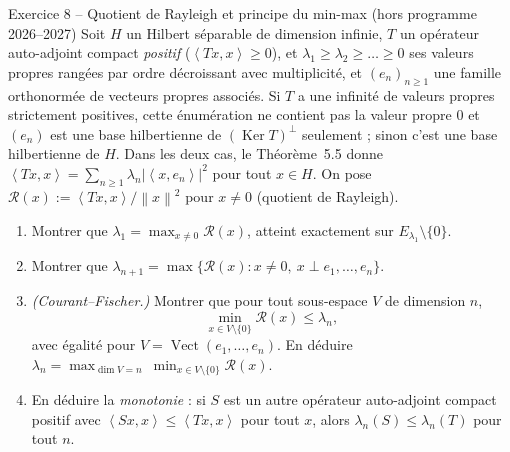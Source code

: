 \documentclass[11pt,a4paper]{article}
\newcommand{\Vect}{\operatorname{Vect}}
\newcommand{\norm}[1]{\left\|#1\right\|}
\newcommand{\ps}[2]{\left\langle #1,#2\right\rangle}
\DeclareMathOperator{\Ker}{Ker}
\theoremstyle{definition}
\begin{document}
\begin{exo}{Exercice 8 -- Quotient de Rayleigh et principe du min-max (hors programme 2026--2027)}
Soit $H$ un Hilbert séparable de dimension infinie, $T$ un opérateur auto-adjoint compact \emph{positif} ($\ps{Tx}x\ge0$), et $\lambda_1\ge\lambda_2\ge\dots\ge0$ ses valeurs propres rangées par ordre décroissant avec multiplicité, et $(e_n)_{n\ge1}$ une famille orthonormée de vecteurs propres associés. Si $T$ a une infinité de valeurs propres strictement positives, cette énumération ne contient pas la valeur propre $0$ et $(e_n)$ est une base hilbertienne de $(\Ker T)^\perp$ seulement ; sinon c'est une base hilbertienne de $H$. Dans les deux cas, le Théorème~5.5 donne $\ps{Tx}x=\sum_{n\ge1}\lambda_n|\ps x{e_n}|^2$ pour tout $x\in H$. On pose $\mathcal R(x):=\ps{Tx}x/\norm x^2$ pour $x\ne0$ (quotient de Rayleigh).
\begin{enumerate}[label=(\alph*)]
  \item Montrer que $\lambda_1=\max_{x\ne0}\mathcal R(x)$, atteint exactement sur $E_{\lambda_1}\setminus\{0\}$.
  \item Montrer que $\lambda_{n+1}=\max\{\mathcal R(x):x\ne0,\ x\perp e_1,\dots,e_n\}$.
  \item \emph{(Courant--Fischer.)} Montrer que pour tout sous-espace $V$ de dimension $n$,
  \[
  \min_{x\in V\setminus\{0\}}\mathcal R(x)\le\lambda_n,
  \]
  avec égalité pour $V=\Vect(e_1,\dots,e_n)$. En déduire $\lambda_n=\max_{\dim V=n}\ \min_{x\in V\setminus\{0\}}\mathcal R(x)$.
  \item En déduire la \emph{monotonie} : si $S$ est un autre opérateur auto-adjoint compact positif avec $\ps{Sx}x\le\ps{Tx}x$ pour tout $x$, alors $\lambda_n(S)\le\lambda_n(T)$ pour tout $n$.
\end{enumerate}
\end{exo}
\end{document}
